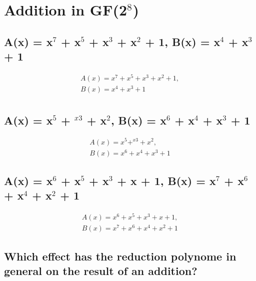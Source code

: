 \section{Addition in GF(2$^{8}$)}


\subsection{A(x) = x$^{7}$ + x$^{5}$ + x$^{3}$ + x$^{2}$ + 1, B(x) = x$^{4}$ + x$^{3}$ + 1}
\label{section:1a}
\begin{equation}
\begin{split}
A(x) = x^{7} + x^{5} + x^{3} + x^{2} + 1, \\
B(x) = x^{4} + x^{3} + 1 \\
\end{split}
\end{equation}

\subsection{A(x) = x$^{5}$ + $^{x3}$ + x$^{2}$, B(x) = x$^{6}$ + x$^{4}$ + x$^{3}$ + 1}
\label{section:1b}
\begin{equation}
\begin{split}
A(x) = x^{5} + ^{x3} + x^{2}, \\
B(x) = x^{6} + x^{4} + x^{3} + 1
\end{split}
\end{equation}

\subsection{A(x) = x$^{6}$ + x$^{5}$ + x$^{3}$ + x + 1, B(x) = x$^{7}$ + x$^{6}$ + x$^{4}$ + x$^{2}$ + 1}
\label{section:1c}
\begin{equation}
\begin{split}
A(x) = x^{6} + x^{5} + x^{3} + x + 1, \\
B(x) = x^{7} + x^{6} + x^{4} + x^{2} + 1
\end{split}
\end{equation}

\subsection{Which effect has the reduction polynome in general on the result of an addition?}
\label{section:1d}


